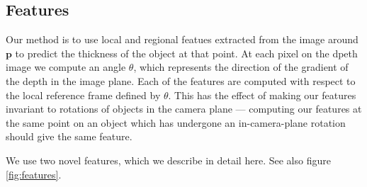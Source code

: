 \documentclass[10pt,twocolumn,letterpaper]{article}
\newcommand{\point}{\mathbf{p}}
\begin{document}
\subsection{Features}
Our method is to use local and regional featues extracted from the image around $\point$ to predict the thickness of the object at that point.
At each pixel on the dpeth image we compute an angle $\theta$, which represents the direction of the gradient of the depth in the image plane.
Each of the features are computed with respect to the local reference frame defined by $\theta$.
This has the effect of making our features invariant to rotations of objects in the camera plane --- computing our features at the same point on an object which has undergone an in-camera-plane rotation should give the same feature.


We use two novel features, which we describe in detail here. See also figure \ref{fig:features}.
\end{document}

